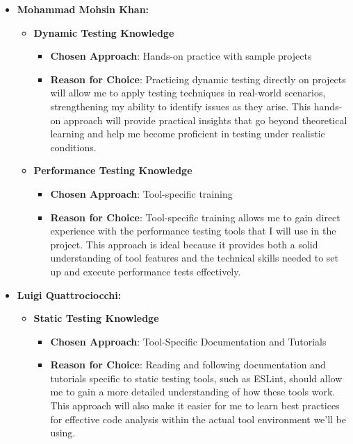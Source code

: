 \documentclass[12pt, titlepage]{article}
\begin{document}
\begin{enumerate}
\begin{itemize}
\begin{itemize}
    \end{itemize}
    \item \textbf{Mohammad Mohsin Khan:}
    \begin{itemize}
      \item \textbf{Dynamic Testing Knowledge}  
      \begin{itemize}
          \item \textbf{Chosen Approach}: Hands-on practice with sample projects
          \item \textbf{Reason for Choice}: Practicing dynamic testing directly on projects will allow me to apply testing techniques in real-world scenarios, strengthening my ability to identify issues as they arise. This hands-on approach will provide practical insights that go beyond theoretical learning and help me become proficient in testing under realistic conditions.
      \end{itemize}
  
      \item \textbf{Performance Testing Knowledge}  
      \begin{itemize}
          \item \textbf{Chosen Approach}: Tool-specific training
          \item \textbf{Reason for Choice}: Tool-specific training allows me to gain direct experience with the performance testing tools that I will use in the project. This approach is ideal because it provides both a solid understanding of tool features and the technical skills needed to set up and execute performance tests effectively.
      \end{itemize}
  
    \end{itemize}
    \item \textbf{Luigi Quattrociocchi:}
    \begin{itemize}
        \item \textbf{Static Testing Knowledge}
        \begin{itemize}
            \item \textbf{Chosen Approach}: Tool-Specific Documentation and Tutorials
            \item \textbf{Reason for Choice}: Reading and following documentation and tutorials specific to static testing tools, such as ESLint, should allow me to gain a more detailed understanding of how these tools work. This approach will also make it easier for me to learn best practices for effective code analysis within the actual tool environment we'll be using.
        \end{itemize}
        

\end{itemize}
\end{itemize}
\end{enumerate}
\end{document}
